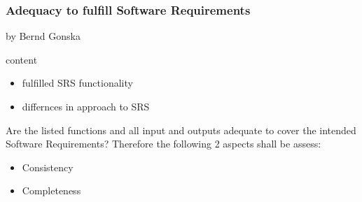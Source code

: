 \subsubsection{Adequacy to fulfill Software Requirements}

by Bernd Gonska

content
\begin{itemize}
\item fulfilled SRS functionality 
\item differnces in approach to SRS
\end{itemize}

Are the listed functions and all input and outputs adequate to cover the intended Software Requirements?
Therefore the following 2 aspects shall be assess:

\begin{itemize}
\item Consistency
\item Completeness
\end{itemize}
